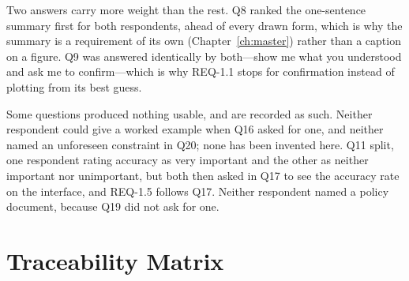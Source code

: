 \documentclass[12pt,a4paper]{report}
\begin{document}
Two answers carry more weight than the rest. Q8 ranked the one-sentence
summary first for both respondents, ahead of every drawn form, which is why
the summary is a requirement of its own (Chapter~\ref{ch:master}) rather than a
caption on a figure. Q9 was answered identically by both---show me what you
understood and ask me to confirm---which is why REQ-1.1 stops for
confirmation instead of plotting from its best guess.

Some questions produced nothing usable, and are recorded as such. Neither
respondent could give a worked example when Q16 asked for one, and neither
named an unforeseen constraint in Q20; none has been invented here. Q11 split,
one respondent rating accuracy as very important and the other as neither
important nor unimportant, but both then asked in Q17 to see the accuracy
rate on the interface, and REQ-1.5 follows Q17. Neither respondent named a
policy document, because Q19 did not ask for one.

\section{Traceability Matrix}
\label{sec:traceability}
\end{document}
